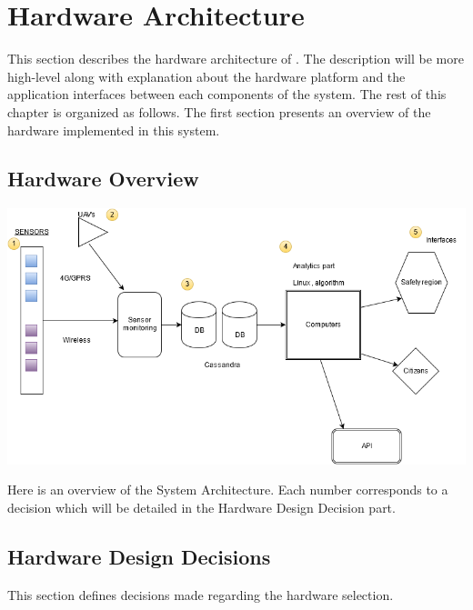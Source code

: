 \chapter{Hardware Architecture}
\label{ch:hardware}
This section describes the hardware architecture of \ProjectName{}. The description will be more high-level along with explanation about the hardware platform and the application interfaces between each components of the system. The rest of this chapter is organized as follows. The first section presents an overview of the hardware implemented in this system. 

\section{Hardware Overview}
\label{sec:hardware-overview}

\includegraphics[scale=0.5]{images/HardwareArchitectureOverview.png}

Here is an overview of the System Architecture. Each number corresponds to a decision which will be detailed in the Hardware Design Decision part.


\section{Hardware Design Decisions}
\label{sec:hardware-decisions}
This section defines decisions made regarding the hardware selection.

